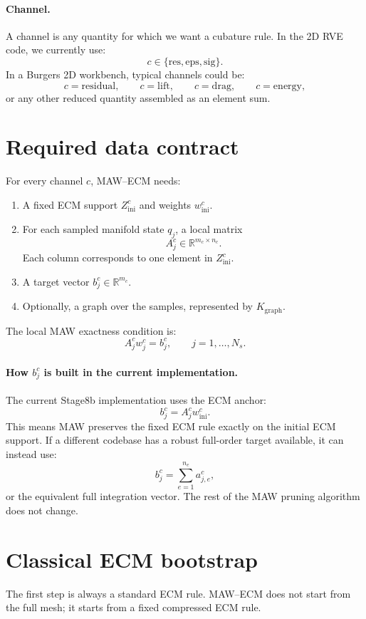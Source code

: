 \documentclass[11pt]{article}
\newcommand{\R}{\mathbb{R}}
\newcommand{\Kgraph}{K_{\mathrm{graph}}}
\newcommand{\winit}{w_{\mathrm{ini}}}
\newcommand{\zinit}{Z_{\mathrm{ini}}}
\begin{document}
\paragraph{Channel.}
A channel is any quantity for which we want a cubature rule.  In the 2D RVE code,
we currently use:
\[
  c\in \{\mathrm{res},\mathrm{eps},\mathrm{sig}\}.
\]
In a Burgers 2D workbench, typical channels could be:
\[
  c=\mathrm{residual},\qquad
  c=\mathrm{lift},\qquad
  c=\mathrm{drag},\qquad
  c=\mathrm{energy},
\]
or any other reduced quantity assembled as an element sum.

\section{Required data contract}

For every channel \(c\), MAW--ECM needs:
\begin{enumerate}[label=\arabic*.]
  \item A fixed ECM support \(\zinit^c\) and weights \(\winit^c\).
  \item For each sampled manifold state \(q_j\), a local matrix
  \[
      A_j^c \in \R^{m_c\times n_c}.
  \]
  Each column corresponds to one element in \(\zinit^c\).
  \item A target vector \(b_j^c\in\R^{m_c}\).
  \item Optionally, a graph over the samples, represented by \(\Kgraph\).
\end{enumerate}

The local MAW exactness condition is:
\[
  A_j^c w_j^c = b_j^c,
  \qquad j=1,\ldots,N_s.
\]

\paragraph{How \(b_j^c\) is built in the current implementation.}
The current Stage8b implementation uses the ECM anchor:
\[
  b_j^c = A_j^c \winit^c.
\]
This means MAW preserves the fixed ECM rule exactly on the initial ECM support.
If a different codebase has a robust full-order target available, it can instead use:
\[
  b_j^c =
  \sum_{e=1}^{n_e} a_{j,e}^c,
\]
or the equivalent full integration vector.  The rest of the MAW pruning algorithm
does not change.

\section{Classical ECM bootstrap}

The first step is always a standard ECM rule.  MAW--ECM does not start from the
full mesh; it starts from a fixed compressed ECM rule.
\end{document}
